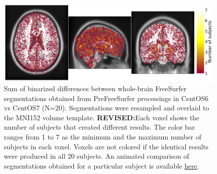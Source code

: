 \documentclass[a4paper,num-refs]{oup-contemporary}
\newcommand{\revised}[1]{\color{blue}\textbf{REVISED:}#1\color{black}}
\begin{document}
\begin{figure}
\centering
  \includegraphics[width=\columnwidth]{figures/brain_segmentation_mni.png} 
  \caption{Sum of binarized differences between whole-brain FreeSurfer
  segmentations obtained from PreFreeSurfer processings in CentOS6 vs CentOS7
   (N=20). Segmentations were resampled and overlaid to the MNI152 volume
  template. 
  \revised{Each voxel shows the number of subjects that created different results. 
  The color bar ranges from 1 to 7 as the minimum and the maximum number of subjects in each voxel.
  Voxels are not colored if the identical results were produced in all 20 subjects.}
  An animated comparison of segmentations obtained for a particular subject is available
\href{https://github.com/big-data-lab-team/HCP-reproducibility-paper/blob/master/figures/fs_brain_segmentation.gif}
{here}.} 
  \label{fig:tissue_class}
\end{figure}
\end{document}
